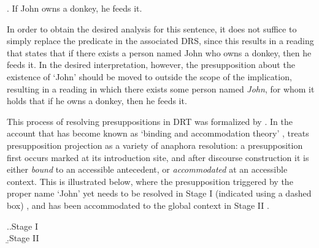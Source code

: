 \ex. If John owns a donkey, he feeds it.

In order to obtain the desired analysis for this sentence, it does not
suffice to simply replace the predicate in the associated DRS, since this
results in a reading that states that if there exists a person named John
who owns a donkey, then he feeds it.  In the desired interpretation,
however, the presupposition about the existence of `John' should be
moved to outside the scope of the implication, resulting in a reading in
which there exists some person named \textit{John}, for whom it holds that if he
owns a donkey, then he feeds it.  

This process of resolving presuppositions in DRT was formalized by
. In the account that has become known
as `binding and accommodation theory'
\cite{geurts1999presuppositions,beaver2002presupposition,bos2003implementing},
 treats presupposition projection as
a variety of anaphora resolution: a presupposition first occurs marked at
its introduction site, and after discourse construction it is either
\textit{bound} to an accessible antecedent, or \textit{accommodated} at an
accessible context. This is illustrated below, where the presupposition
triggered by the proper name `John' yet needs to be resolved in Stage
I (indicated using a dashed box) \Next[a], and has been accommodated to the
global context in Stage II \Next[b].

\begin{flushleft}
\begin{minipage}{0.85\linewidth}
\begin{multicols}{2}
\ex.\a.Stage I\\
  \b.\vspace*{-0.4cm}Stage II\\

\end{multicols}
\end{minipage}\\
\end{flushleft}

